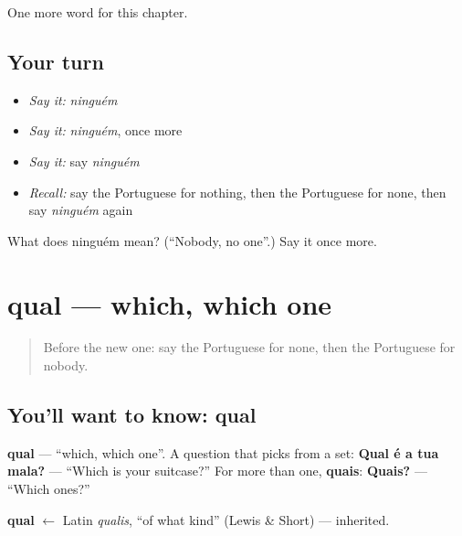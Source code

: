 \begin{grammarlens}[title={What you've built}]
One more word for this chapter.
\end{grammarlens}

\subsection*{Your turn}
\begin{itemize}
\raggedright
  \item \emph{Say it:} \emph{ninguém}
  \item \emph{Say it:} \emph{ninguém}, once more
  \item \emph{Say it:} say \emph{ninguém}
  \item \emph{Recall:} say the Portuguese for nothing, then the Portuguese for none, then say \emph{ninguém} again
\end{itemize}

\begin{tcolorbox}[breakable,colback=teal!4,colframe=teal!35!black,title={Before you move on}]
What does ninguém mean? (\textquotedblleft{}Nobody, no one\textquotedblright{}.) Say it once more.
\end{tcolorbox}
\section[qual]{qual — which, which one}

\label{lesson:PT-C134-qual}



\begin{quote}
Before the new one: say the Portuguese for none, then the Portuguese for nobody.
\end{quote}

\subsection*{You'll want to know: qual}
\textbf{qual} — \textquotedblleft{}which, which one\textquotedblright{}. A question that picks from a set: \textbf{Qual é a tua mala?} — \textquotedblleft{}Which is your suitcase?\textquotedblright{} For more than one, \textbf{quais}: \textbf{Quais?} — \textquotedblleft{}Which ones?\textquotedblright{}

\begin{cousinweb}
\textbf{qual} $\leftarrow$ Latin \emph{qualis}, \textquotedblleft{}of what kind\textquotedblright{} (Lewis \& Short) — inherited.
\end{cousinweb}

